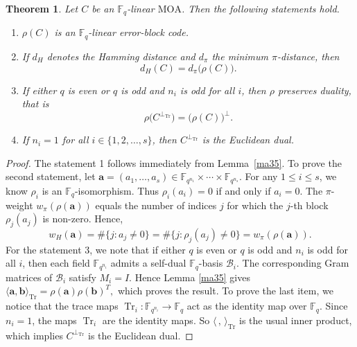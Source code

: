 \documentclass[11pt]{article}
\newtheorem{Theorem}{Theorem}[section]
\newtheorem{Definition and Notation}[Theorem]{Definition and Notation}
\begin{document}
\begin{Theorem}\label{ma15} Let $C$ be an $\mathbb{F}_q$-linear $\mathrm{MOA}$. Then the following statements hold.
\begin{enumerate}
    \item $\rho(C)$ is an $\mathbb F_q$-linear error-block code.
    \item If $d_H$ denotes the Hamming distance and $d_\pi$ the minimum $\pi$-distance, then
    $$d_H(C)=d_\pi\big(\rho(C)\big).$$
    \item If either $q$ is even or $q$ is odd and $n_i$ is odd for all $i$, then $\rho$ preserves duality, that is
    $$\rho\big(C^{\perp_{\operatorname{Tr}}}\big)=\big(\rho(C)\big)^{\perp}.$$
    \item If $n_i=1$ for all $i\in\{1, 2, \ldots, s\}$, then $C^{\perp_{\text{Tr}}} $ is the Euclidean dual.
\end{enumerate}  
\end{Theorem}

\begin{proof}
The statement 1 follows immediately from Lemma~\ref{ma35}. To prove the second statement, let $\mathbf a=(a_1,\dots,a_s)\in
\mathbb F_{q^{n_1}}\times\cdots\times\mathbb F_{q^{n_s}}$. For any $1\leq i\leq s$, we know $\rho_i$ is an $\mathbb F_q$-isomorphism. Thus $\rho_i(a_i)=0$ if and only if $a_i=0$. 
The $\pi$-weight $w_\pi(\rho(\mathbf a))$ equals the number of indices $j$ for which the $j$-th block $\rho_j(a_j)$ is non-zero. Hence,
$$
w_H(\mathbf a)=\#\{j:a_j\neq0\}=\#\{j:\rho_j(a_j)\neq0\}=w_\pi(\rho(\mathbf a)).
$$  
For the statement 3, we note that if either $q$ is even or $q$ is odd and $n_i$ is odd
for all $i$, then each field $\mathbb{F}_{q^{n_i}}$ admits a self-dual
$\mathbb{F}_q$-basis $\mathcal B_i$. The corresponding Gram matrices of $\mathcal B_i$ satisfy $M_i=I$. Hence Lemma \ref{ma35} gives $\langle \mathbf a,\mathbf b\rangle_{\operatorname{Tr}}=\rho(\mathbf a)\rho(\mathbf b)^T,$ which proves the result.
To prove the last item, we notice that the trace maps $\operatorname{Tr}_i:\mathbb F_{q^{n_i}}\to\mathbb F_q$ act as the identity map over $\mathbb F_q$. Since $n_i=1$, the maps $\operatorname{Tr}_i$ are the identity maps. So $\langle\, ,\,\rangle_{\operatorname{Tr}}$ is the usual inner product, which implies $C^{\perp_{\text{Tr}}} $ is the Euclidean dual.
\end{proof}

\end{document}
